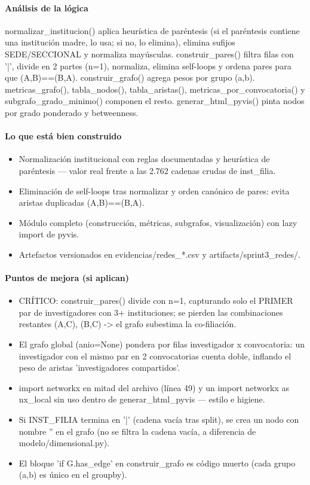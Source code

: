 \paragraph{Análisis de la lógica}
normalizar\_institucion() aplica heurística de paréntesis (si el paréntesis contiene una institución madre, lo usa; si no, lo elimina), elimina sufijos SEDE/SECCIONAL y normaliza mayúsculas. construir\_pares() filtra filas con '|', divide en 2 partes (n=1), normaliza, elimina self-loops y ordena pares para que (A,B)==(B,A). construir\_grafo() agrega pesos por grupo (a,b). metricas\_grafo(), tabla\_nodos(), tabla\_aristas(), metricas\_por\_convocatoria() y subgrafo\_grado\_minimo() componen el resto. generar\_html\_pyvis() pinta nodos por grado ponderado y betweenness.

\paragraph{Lo que está bien construido}
\begin{itemize}
  \item Normalización institucional con reglas documentadas y heurística de paréntesis --- valor real frente a las 2.762 cadenas crudas de inst\_filia.
  \item Eliminación de self-loops tras normalizar y orden canónico de pares: evita aristas duplicadas (A,B)==(B,A).
  \item Módulo completo (construcción, métricas, subgrafos, visualización) con lazy import de pyvis.
  \item Artefactos versionados en evidencias/redes\_*.csv y artifacts/sprint3\_redes/.
\end{itemize}

\paragraph{Puntos de mejora (si aplican)}
\begin{itemize}
  \item CRÍTICO: construir\_pares() divide con n=1, capturando solo el PRIMER par de investigadores con 3+ instituciones; se pierden las combinaciones restantes (A,C), (B,C) -> el grafo subestima la co-filiación.
  \item El grafo global (anio=None) pondera por filas investigador x convocatoria: un investigador con el mismo par en 2 convocatorias cuenta doble, inflando el peso de aristas 'investigadores compartidos'.
  \item import networkx en mitad del archivo (línea 49) y un import networkx as nx\_local sin uso dentro de generar\_html\_pyvis --- estilo e higiene.
  \item Si INST\_FILIA termina en '|' (cadena vacía tras split), se crea un nodo con nombre '' en el grafo (no se filtra la cadena vacía, a diferencia de modelo/dimensional.py).
  \item El bloque 'if G.has\_edge' en construir\_grafo es código muerto (cada grupo (a,b) es único en el groupby).
\end{itemize}

